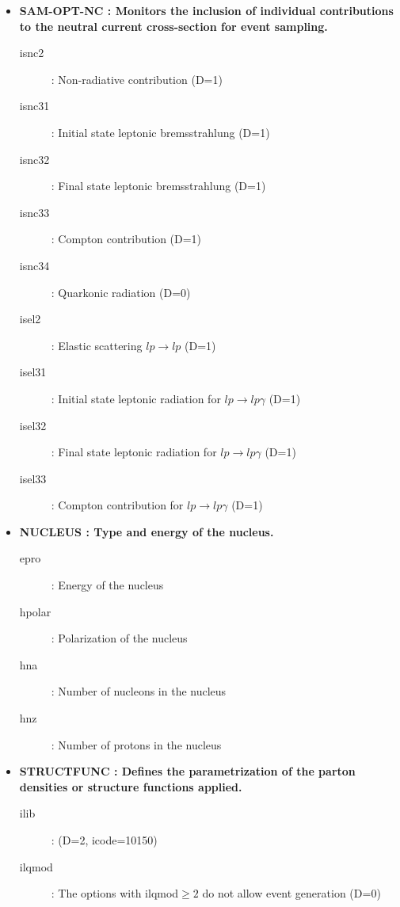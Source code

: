 \documentclass[letterpaper,12pt]{article}
\begin{document}
\begin{itemize}
\item \textbf{SAM-OPT-NC : Monitors the inclusion of individual contributions to the neutral current
cross-section for event sampling.}
\begin{description}
\item[isnc2] : Non-radiative contribution (D=1)
\item[isnc31] : Initial state leptonic bremsstrahlung (D=1)
\item[isnc32] : Final state leptonic bremsstrahlung (D=1)
\item[isnc33] : Compton contribution (D=1)
\item[isnc34] : Quarkonic radiation (D=0)
\item[isel2] : Elastic scattering $lp\rightarrow lp$ (D=1)
\newpage
\item[isel31] : Initial state leptonic radiation for $lp\rightarrow lp\gamma$ (D=1)
\item[isel32] : Final state leptonic radiation for $lp\rightarrow lp\gamma$ (D=1)
\item[isel33] : Compton contribution for $lp\rightarrow lp\gamma$ (D=1)
\end{description}
\item \textbf{NUCLEUS : Type and energy of the nucleus.}
\begin{description}
\item[epro] : Energy of the nucleus
\item[hpolar] : Polarization of the nucleus
\item[hna] : Number of nucleons in the nucleus
\item[hnz] : Number of protons in the nucleus
\end{description}
\item \textbf{STRUCTFUNC : Defines the parametrization of the parton densities or structure functions
applied.}
\begin{description}
\item[ilib] : (D=2, icode=10150)
\item[ilqmod] : The options with ilqmod$\geq2$ do not allow event generation (D=0)
\begin{description}

\end{description}
\end{description}
\end{itemize}
\end{document}
